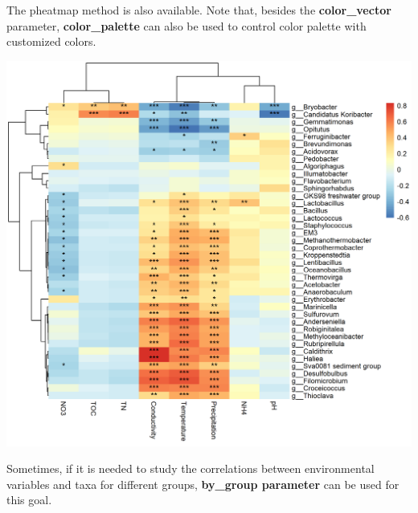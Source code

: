 \documentclass[
]{book}
\newenvironment{Shaded}{\begin{snugshade}}{\end{snugshade}}
\newcommand{\AttributeTok}[1]{\textcolor[rgb]{0.77,0.63,0.00}{#1}}
\newcommand{\CommentTok}[1]{\textcolor[rgb]{0.56,0.35,0.01}{\textit{#1}}}
\newcommand{\ConstantTok}[1]{\textcolor[rgb]{0.00,0.00,0.00}{#1}}
\newcommand{\DecValTok}[1]{\textcolor[rgb]{0.00,0.00,0.81}{#1}}
\newcommand{\FunctionTok}[1]{\textcolor[rgb]{0.00,0.00,0.00}{#1}}
\newcommand{\NormalTok}[1]{#1}
\newcommand{\SpecialCharTok}[1]{\textcolor[rgb]{0.00,0.00,0.00}{#1}}
\newcommand{\StringTok}[1]{\textcolor[rgb]{0.31,0.60,0.02}{#1}}
\begin{document}
The pheatmap method is also available.
Note that, besides the \textbf{color\_vector} parameter,
\textbf{color\_palette} can also be used to control color palette with customized colors.

\begin{Shaded}
\end{Shaded}

\begin{center}\includegraphics[width=700px]{Images/plot_corr_pheatmap} \end{center}

Sometimes, if it is needed to study the correlations between environmental variables and taxa for different groups,
\textbf{by\_group parameter} can be used for this goal.
\end{document}
